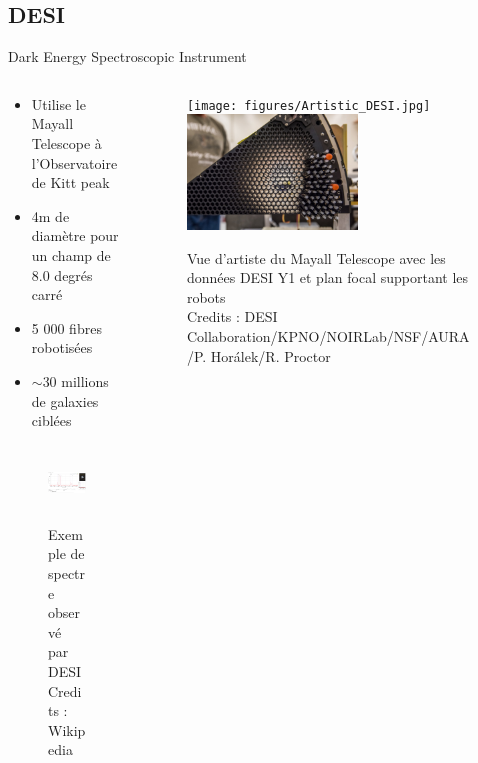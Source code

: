 \documentclass{beamer}
\newcommand{\credits}[1]{\tiny Credits : #1}
\begin{document}
\subsection{DESI}

\begin{frame}{Dark Energy Spectroscopic Instrument}
\begin{columns}
\begin{column}{.5\textwidth}
	\begin{itemize}
		\item Utilise le Mayall Telescope à l'Observatoire de Kitt peak 
		\item 4m de diamètre pour un champ de 8.0 degrés carré
		\item 5 000 fibres robotisées
		\item $\sim 30$ millions de galaxies ciblées
	\end{itemize}
	\begin{figure}
		\includegraphics[height=2cm]{figures/DESI_spec.png}
		\caption{Exemple de spectre observé par DESI \credits{Wikipedia}}
	\end{figure}
\end{column}

\begin{column}{.5\textwidth}
	\begin{figure}
		\centering
		\texttt{[image: figures/Artistic\_DESI.jpg]}
		\includegraphics[width=0.6\textwidth]{figures/DESI_focal_plane.jpg}
		\caption{Vue d'artiste du Mayall Telescope avec les données DESI Y1 et plan focal supportant les robots\\ \credits{DESI Collaboration/KPNO/NOIRLab/NSF/AURA/P. Horálek/R. Proctor}}
	\end{figure}
\end{column}
\end{columns}
\end{frame}
\end{document}
